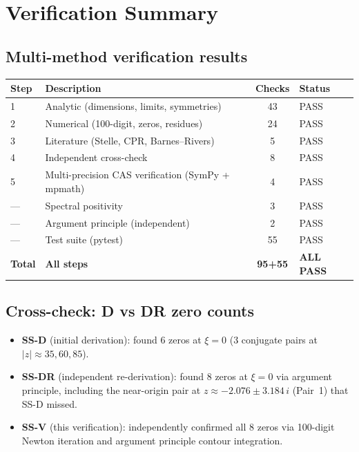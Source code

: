 \documentclass[11pt,a4paper]{article}
\begin{document}
\section{Verification Summary}
\label{sec:verification}

\subsection{Multi-method verification results}

\begin{center}
\begin{tabular}{l l c l}
\toprule
Step & Description & Checks & Status \\
\midrule
1 & Analytic (dimensions, limits, symmetries) & 43 & \textcolor{proven}{PASS} \\
2 & Numerical (100-digit, zeros, residues) & 24 & \textcolor{proven}{PASS} \\
3 & Literature (Stelle, CPR, Barnes--Rivers) & 5 & \textcolor{proven}{PASS} \\
4 & Independent cross-check & 8 & \textcolor{proven}{PASS} \\
5 & Multi-precision CAS verification (SymPy + mpmath) & 4 & \textcolor{proven}{PASS} \\
--- & Spectral positivity & 3 & \textcolor{proven}{PASS} \\
--- & Argument principle (independent) & 2 & \textcolor{proven}{PASS} \\
--- & Test suite (pytest) & 55 & \textcolor{proven}{PASS} \\
\midrule
\textbf{Total} & \textbf{All steps} & \textbf{95+55} & \textcolor{proven}{\textbf{ALL PASS}} \\
\bottomrule
\end{tabular}
\end{center}

\subsection{Cross-check: D vs DR zero counts}

\begin{itemize}
  \item \textbf{SS-D} (initial derivation): found 6 zeros at $\xi = 0$
    (3 conjugate pairs at $|z| \approx 35, 60, 85$).
  \item \textbf{SS-DR} (independent re-derivation): found 8 zeros at
    $\xi = 0$ via argument principle, including the near-origin pair at
    $z \approx -2.076 \pm 3.184\,i$ (Pair~1) that SS-D missed.
  \item \textbf{SS-V} (this verification): independently confirmed all 8 zeros
    via 100-digit Newton iteration and argument principle contour integration.
\end{itemize}
\end{document}
